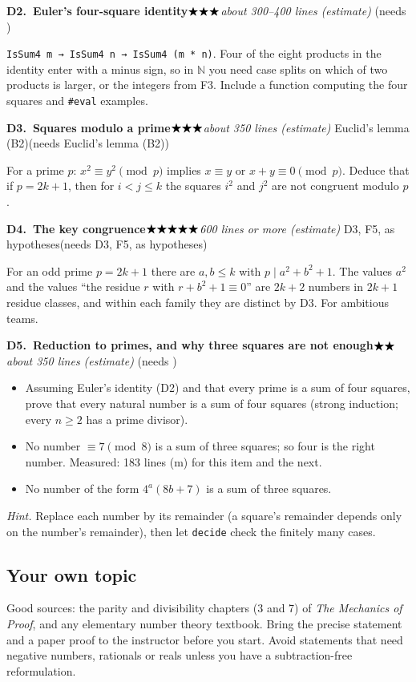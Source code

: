 \documentclass[11pt]{article}
\newcommand{\lean}[1]{\texttt{#1}}
\newcommand{\N}{\ensuremath{\mathbb{N}}}
\newcommand{\dvd}{\ensuremath{\mid}}
\newcommand{\stars}[1]{\ensuremath{%
  \ifcase#1\or\bigstar\or\bigstar\bigstar\or\bigstar\bigstar\bigstar\or
  \bigstar\bigstar\bigstar\bigstar\or\bigstar\bigstar\bigstar\bigstar\bigstar\fi}}
\newcommand{\topic}[5]{%
  \par\medskip\noindent\textbf{#1.\ #2}\hfill\quad\stars{#3}\enspace\textit{#4}%
  \ifx\relax#5\relax\else\enspace(needs #5)\fi\par\nopagebreak}
\begin{document}
\topic{D2}{Euler's four-square identity}{3}{about 300--400 lines (estimate)}{}
\lean{IsSum4 m → IsSum4 n → IsSum4 (m * n)}. Four of the eight products in the identity enter
with a minus sign, so in \N{} you need case splits on which of two products is larger, or the
integers from F3. Include a function computing the four squares and \lean{\#eval} examples.

\topic{D3}{Squares modulo a prime}{3}{about 350 lines (estimate)}{Euclid's lemma (B2)}
For a prime $p$: $x^2 \equiv y^2 \pmod p$ implies $x \equiv y$ or $x + y \equiv 0 \pmod p$.
Deduce that if $p = 2k+1$, then for $i < j \le k$ the squares $i^2$ and $j^2$ are not congruent
modulo $p$.

\topic{D4}{The key congruence}{5}{600 lines or more (estimate)}{D3, F5, as hypotheses}
For an odd prime $p = 2k+1$ there are $a, b \le k$ with $p \dvd a^2 + b^2 + 1$. The values $a^2$
and the values ``the residue $r$ with $r + b^2 + 1 \equiv 0$'' are $2k+2$ numbers in $2k+1$
residue classes, and within each family they are distinct by D3. For ambitious teams.

\topic{D5}{Reduction to primes, and why three squares are not enough}{2}{about 350 lines
(estimate)}{}
\begin{itemize}
\item Assuming Euler's identity (D2) and that every prime is a sum of four squares, prove that
  every natural number is a sum of four squares (strong induction; every $n \ge 2$ has a prime
  divisor).
\item No number $\equiv 7 \pmod 8$ is a sum of three squares; so four is the right number.
  Measured: 183 lines (m) for this item and the next.
\item No number of the form $4^a(8b + 7)$ is a sum of three squares.
\end{itemize}
\emph{Hint.} Replace each number by its remainder (a square's remainder depends only on the
number's remainder), then let \lean{decide} check the finitely many cases.

\subsection*{Your own topic}
Good sources: the parity and divisibility chapters (3 and 7) of \emph{The Mechanics of Proof},
and any elementary number theory textbook. Bring the precise statement and a paper proof to the
instructor before you start. Avoid statements that need negative numbers, rationals or reals
unless you have a subtraction-free reformulation.
\end{document}
